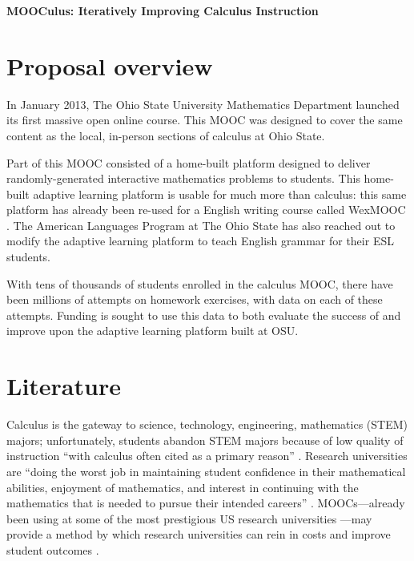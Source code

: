 \documentclass[12pt]{article}
\begin{document}
\begin{center}
  \textbf{MOOCulus: Iteratively Improving Calculus Instruction}
\end{center}

% 

\section{Proposal overview}

In January 2013, The Ohio State University Mathematics Department
launched its first massive open online course.  This MOOC was designed
to cover the same content as the local, in-person sections of calculus
at Ohio State.

Part of this MOOC consisted of a home-built platform designed to
deliver randomly-generated interactive mathematics problems to
students.  This home-built adaptive learning platform is usable for
much more than calculus: this same platform has already been re-used
for a English writing course called
WexMOOC \parencite{gates-foundation-grant}.  The American Languages
Program at The Ohio State has also reached out to modify the adaptive
learning platform to teach English grammar for their ESL students.

With tens of thousands of students enrolled in the calculus MOOC,
there have been millions of attempts on homework exercises, with data
on each of these attempts.  Funding is sought to use this data to both
evaluate the success of and improve upon the adaptive learning
platform built at OSU.

\section{Literature}

Calculus is the gateway to science, technology, engineering,
mathematics (STEM) majors; unfortunately, students abandon STEM majors
because of low quality of instruction ``with calculus often cited as a
primary reason'' \parencite{calculus-programs}.  Research universities
are ``doing the worst job in maintaining student confidence in their
mathematical abilities, enjoyment of mathematics, and interest in
continuing with the mathematics that is needed to pursue their
intended careers'' \parencite{calculus-students}.  MOOCs---already
been using at some of the most prestigious US research
universities \parencite{morris2013moocs}---may provide a method by
which research universities can rein in costs and improve student
outcomes \parencite{bowen2013higher}.
\end{document}
